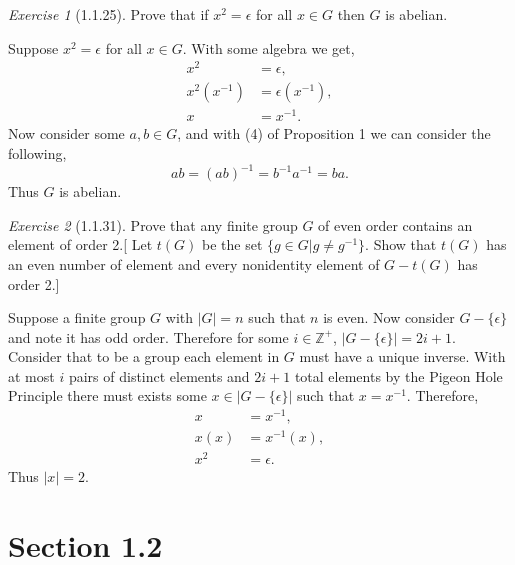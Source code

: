 \documentclass[12pt]{amsart}
\makeatletter
\theoremstyle{remark}
\newtheorem*{exercise}{Exercise}%
\def\ZZ{\ensuremath{\mathbb Z}}
\renewenvironment{proof}[1][\proofname]{\par\doublespacing
  \pushQED{\qed}%
  \normalfont \topsep6\p@\@plus6\p@\relax
  \list{}{%
    \settowidth{\leftmargin}{\itshape\proofname:\hskip\labelsep}%
    \setlength{\labelwidth}{0pt}%
    \setlength{\itemindent}{-\leftmargin}%
  }%
  \item[\hskip\labelsep\itshape#1\@addpunct{:}]\ignorespaces
}{%
  \popQED\endlist\@endpefalse
  \singlespacing
}
\theoremstyle{mycomment}
\makeatother
\begin{document}
\begin{exercise}[1.1.25] Prove that if $x^2 = \epsilon$ for all $x \in G$ then $G$ is abelian. 
  \begin{proof} Suppose $x^2 = \epsilon$ for all $x \in G$. With some algebra we get, 
    \begin{align*}
      x^2 &= \epsilon,\\
      x^2(x^{-1}) &= \epsilon(x^{-1}),\\
      x&= x^{-1}.
    \end{align*}
    Now consider some $a, b \in G$, and with (4) of Proposition 1 we can consider the following, 
    \begin{equation*}
      ab = (ab)^{-1} = b^{-1}a^{-1} = ba.  
    \end{equation*}
    Thus $G$ is abelian. 
  \end{proof}
\end{exercise}



\begin{exercise}[1.1.31] Prove that any finite group $G$ of even order contains an element of order 2.[ Let $t(G)$ be the set $\{ g \in G | g \neq g^{-1}\}$. Show that $t(G)$
  has an even number of element and every nonidentity element of $G - t(G)$ has order 2.]
  \begin{proof} Suppose a finite group $G$ with $|G| = n$ such that $n$ is even. Now consider $G - \{\epsilon\}$ and note it has odd order. 
    Therefore for some $i \in \ZZ^+$, $|G - \{\epsilon\}| = 2i + 1$.
    Consider that to be a group each element in $G$ must have a unique inverse. With at most $i$ pairs of distinct elements and $2i + 1$ total elements by the Pigeon Hole Principle
    there must exists some $x \in |G - \{\epsilon\}|$ such that $x = x^{-1}$. Therefore, 
    \begin{align*}
      x &= x^{-1},\\
      x(x) &= x^{-1}(x),\\
      x^2 &= \epsilon.
    \end{align*}
    Thus $|x| = 2$.
  \end{proof}  
\end{exercise}


\section*{\textbf{Section 1.2}}
\end{document}
